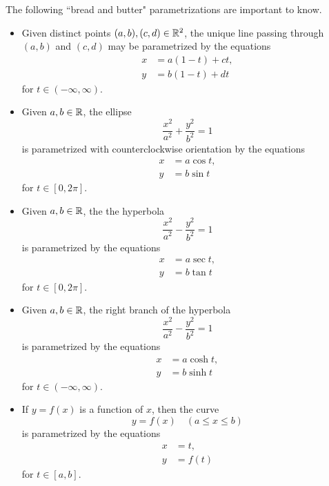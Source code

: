 \begin{remark}
The following ``bread and butter" parametrizations are important to know.
\begin{itemize}
\item
Given distinct points $(a,b), (c,d)\in\mathbb R^2$, the unique line passing through $(a,b)$ and $(c,d)$ may be parametrized by the equations
\begin{align*}
x & = a(1-t) + ct,\\
y &=  b(1-t) + dt
\end{align*}
for $t\in (-\infty, \infty)$.
\item
Given $a, b\in \mathbb R$, the ellipse
\begin{equation*}
\frac{x^2}{a^2}+\frac{y^2}{b^2}=1
\end{equation*}
is parametrized with counterclockwise orientation by the equations
\begin{align*}
x & = a\cos t,\\
y &= b\sin t
\end{align*}
for $t\in [0,2\pi]$.
\item
Given $a, b\in \mathbb R$, the the hyperbola
\begin{equation*}
\frac{x^2}{a^2}-\frac{y^2}{b^2}=1
\end{equation*}
is parametrized by the equations
\begin{align*}
x & = a\sec t,\\
y &= b\tan t
\end{align*}
for $t\in [0,2\pi]$.
\item
Given $a, b\in \mathbb R$, the right branch of the hyperbola
\begin{equation*}
\frac{x^2}{a^2}-\frac{y^2}{b^2}=1
\end{equation*}
is parametrized by the equations
\begin{align*}
x & = a\cosh t,\\
y &= b\sinh t
\end{align*}
for $t\in (-\infty,\infty)$.
\item If $y=f(x)$ is a function of $x$, then the curve
\begin{equation*}
y=f(x)\quad (a\le x\le b)
\end{equation*}
is parametrized by the equations
\begin{align*}
x &= t,\\
y &=f(t)
\end{align*}
for $t\in [a,b]$.
\end{itemize}
\end{remark}

